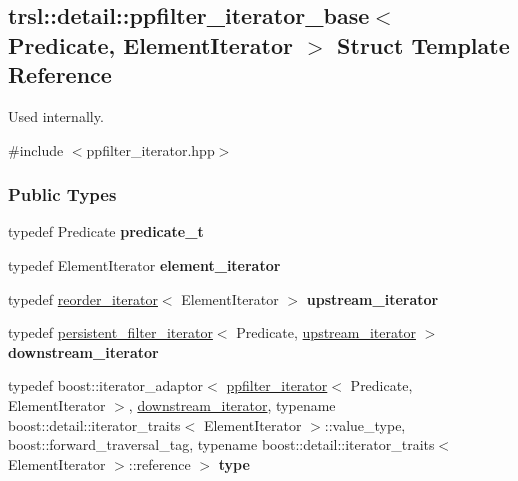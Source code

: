 \hypertarget{structtrsl_1_1detail_1_1ppfilter__iterator__base}{
\subsection{trsl::detail::ppfilter\_\-iterator\_\-base$<$ Predicate, ElementIterator $>$ Struct Template Reference}
\label{structtrsl_1_1detail_1_1ppfilter__iterator__base}
}


Used internally.  


{\ttfamily \#include $<$ppfilter\_\-iterator.hpp$>$}\subsubsection*{Public Types}
\begin{DoxyCompactItemize}
\item 
\hypertarget{structtrsl_1_1detail_1_1ppfilter__iterator__base_ad33a4f9f792737abbebe79d5478254bf}{
typedef Predicate {\bfseries predicate\_\-t}}
\label{structtrsl_1_1detail_1_1ppfilter__iterator__base_ad33a4f9f792737abbebe79d5478254bf}

\item 
\hypertarget{structtrsl_1_1detail_1_1ppfilter__iterator__base_ada5b7212956e6cf0f471cfabef841ed2}{
typedef ElementIterator {\bfseries element\_\-iterator}}
\label{structtrsl_1_1detail_1_1ppfilter__iterator__base_ada5b7212956e6cf0f471cfabef841ed2}

\item 
\hypertarget{structtrsl_1_1detail_1_1ppfilter__iterator__base_a5cae90de5a0029e99714a6d0d83f3162}{
typedef \hyperlink{classtrsl_1_1reorder__iterator}{reorder\_\-iterator}$<$ ElementIterator $>$ {\bfseries upstream\_\-iterator}}
\label{structtrsl_1_1detail_1_1ppfilter__iterator__base_a5cae90de5a0029e99714a6d0d83f3162}

\item 
\hypertarget{structtrsl_1_1detail_1_1ppfilter__iterator__base_a533a06b1295bd4b9d0c47f8bebf8073f}{
typedef \hyperlink{classtrsl_1_1persistent__filter__iterator}{persistent\_\-filter\_\-iterator}$<$ Predicate, \hyperlink{classtrsl_1_1reorder__iterator}{upstream\_\-iterator} $>$ {\bfseries downstream\_\-iterator}}
\label{structtrsl_1_1detail_1_1ppfilter__iterator__base_a533a06b1295bd4b9d0c47f8bebf8073f}

\item 
\hypertarget{structtrsl_1_1detail_1_1ppfilter__iterator__base_a3e4e3af9f7da9d275b5eda19ecfaa2ab}{
typedef boost::iterator\_\-adaptor$<$ \hyperlink{classtrsl_1_1ppfilter__iterator}{ppfilter\_\-iterator}$<$ Predicate, ElementIterator $>$, \hyperlink{classtrsl_1_1persistent__filter__iterator}{downstream\_\-iterator}, typename boost::detail::iterator\_\-traits$<$ ElementIterator $>$::value\_\-type, boost::forward\_\-traversal\_\-tag, typename boost::detail::iterator\_\-traits$<$ ElementIterator $>$::reference $>$ {\bfseries type}}
\label{structtrsl_1_1detail_1_1ppfilter__iterator__base_a3e4e3af9f7da9d275b5eda19ecfaa2ab}

\end{DoxyCompactItemize}


